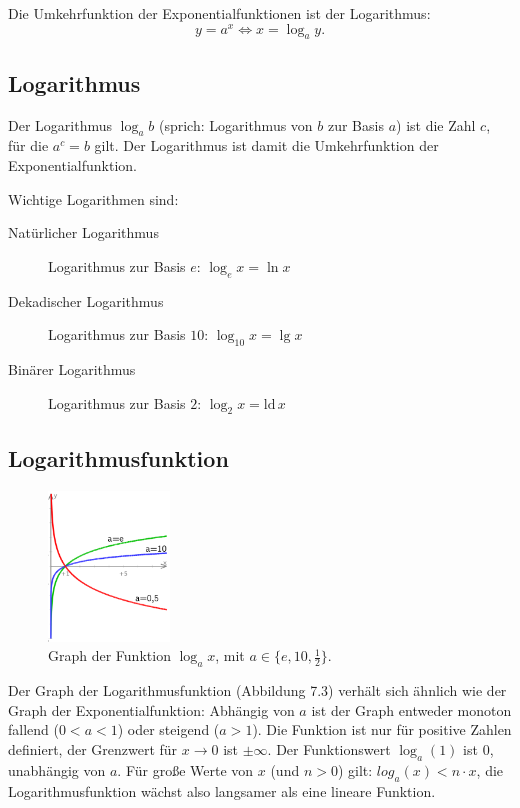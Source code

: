 \noindent Die Umkehrfunktion der Exponentialfunktionen ist der Logarithmus:
\[y = a^x \Longleftrightarrow x = \log_a y.\]


\subsection{Logarithmus}
Der Logarithmus $\log_a b$ (sprich: Logarithmus von $b$ zur Basis $a$) ist die
Zahl $c$, für die $a^c = b$ gilt. Der Logarithmus ist damit die
Umkehrfunktion der Exponentialfunktion.

\noindent Wichtige Logarithmen sind:

\begin{description}
 \item[Natürlicher Logarithmus] Logarithmus zur Basis $e$: $\log_e x = \ln x$
 \item[Dekadischer Logarithmus] Logarithmus zur Basis $10$: $\log_{10} x = \lg
x$ %
 \item[Binärer Logarithmus] Logarithmus zur Basis $2$: $\log_2 x = \text{ld}\,
x$
\end{description}

\subsection{Logarithmusfunktion}
\begin{figure}
\begin{center}
\includegraphics[height=4cm]{img/log.pdf}
\end{center}
\label{fig:logarithmus}
\caption{Graph der Funktion $\log_a x$, mit $a \in\{e, 10, \frac{1}{2}\}$.}
\end{figure}

Der Graph der Logarithmusfunktion (Abbildung 7.3) verhält sich ähnlich wie der Graph der
Exponentialfunktion: Abhängig von $a$ ist der Graph entweder monoton fallend
($0 < a < 1$) oder steigend ($a>1$). Die Funktion ist nur für positive Zahlen
definiert, der Grenzwert für $x \rightarrow 0$ ist $\pm\infty$. Der
Funktionswert $\log_a(1)$ ist $0$, unabhängig von $a$.
Für große Werte von $x$ (und $n > 0$) gilt: $log_a (x) < n\cdot x$, die Logarithmusfunktion wächst also langsamer als eine lineare Funktion.

